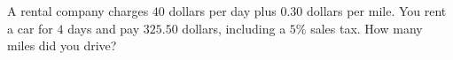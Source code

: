 A rental company charges $40$ dollars per day plus $0.30$ dollars per mile. You rent a car for $4$ days and pay $325.50$ dollars, including a $5\%$ sales tax. How many miles did you drive?
